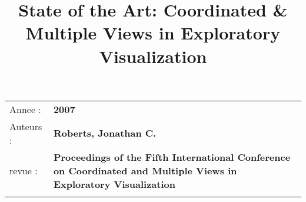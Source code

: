 \documentclass[10pt]{article}
\begin{document}
\title{State of the Art: Coordinated \& Multiple Views in Exploratory Visualization}
\maketitle

\begin{longtable}[c]{@{}ll@{}}
\toprule\addlinespace

Annee : & \textbf{2007}
\\\addlinespace

Auteurs : & \textbf{Roberts, Jonathan C.}
\\\addlinespace

revue : & \textbf{Proceedings of the Fifth International Conference on Coordinated and Multiple Views in Exploratory Visualization}
\\\addlinespace

\bottomrule
\end{longtable}
\end{document}
